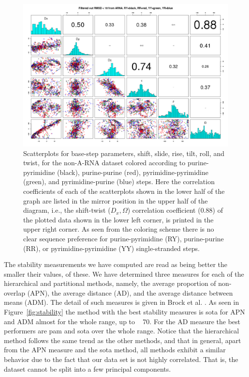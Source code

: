 \begin{figure}
 \centering
\includegraphics[angle=90, scale=0.5]{Chapter2/noarna_step.png}
\caption{Scatterplots  for base-step  parameters, shift,  slide, rise,
  tilt, roll,  and twist, for the non-A-RNA  dataset colored according
  to      purine-pyrimidine     (black),      purine-purine     (red),
  pyrimidine-pyrimidine   (green),    and   pyrimidine-purine   (blue)
  steps. Here the correlation coefficients of each of the scatterplots
  shown  in the  lower half  of  the graph  are listed  in the  mirror
  position in  the upper  half of the  diagram, i.e.,  the shift-twist
  ($D_{x}, \Omega$) correlation coefficient (0.88) of the plotted data
  shown  in the  lower  left corner,  is  printed in  the upper  right
  corner.  As  seen  from the  coloring  scheme there  is no  clear
  sequence preference for  purine-pyrimidine (RY), purine-purine (RR),
  or pyrimidine-pyrimidine (YY) single-stranded steps.  }
 \label{fig:pairsnoarna}
\end{figure}

The stability measurements  we have computed are read  as being better
the smaller their values, of  these. We have determined three measures
for  each of  the hierarchical  and partitional  methods,  namely, the
average proportion  of non-overlap  (APN), the average  distance (AD),
and  the average  distance between  means (ADM).   The detail  of such
measures  is given  in Brock  et  al.  \cite{brock2008}.   As seen  in
Figure~\ref{fig:stability} the method with the best stability measures
is sota for APN  and ADM almost for the whole range,  up to ~ 70.  For
the AD  measure the best  performers are pam  and sota over  the whole
range.  Notice that the hierarchical  method follows the same trend as
the other methods, and that in general, apart from the APN measure and
the sota  method, all  methods exhibit a  similar behavior due  to the
fact that our data set is  not highly correlated. That is, the dataset
cannot be split into a few principal components.

